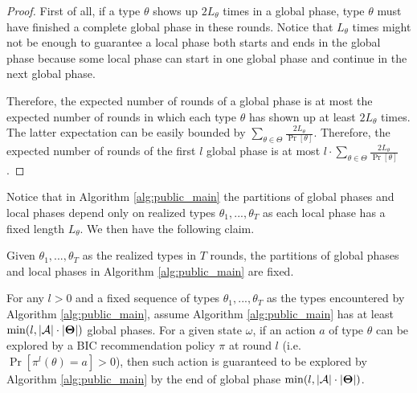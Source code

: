 \begin{proof}
First of all, if a type $\theta$ shows up $2L_{\theta}$ times in a global phase, type $\theta$ must have finished a complete global phase in these rounds. Notice that $L_{\theta}$ times might not be enough to guarantee a local phase both starts and ends in the global phase because some local phase can start in one global phase and continue in the next global phase. 

Therefore, the expected number of rounds of a global phase is at most the expected number of rounds in which each type $\theta$ has shown up at least $2L_{\theta}$ times. The latter expectation can be easily bounded by $\sum_{\theta\in\varTheta} \frac{2L_{\theta}}{\Pr[\theta]}$. Therefore, the expected number of rounds of the first $l$ global phase is at most $l \cdot \sum_{\theta\in\varTheta} \frac{2L_{\theta}}{\Pr[\theta]}$.
\end{proof}

Notice that in Algorithm \ref{alg:public_main} the partitions of global phases and local phases depend only on realized types $\theta_1,...,\theta_T$ as each local phase has a fixed length $L_{\theta}$. We then have the following claim.
\begin{claim}
Given $\theta_1,...,\theta_T$ as the realized types in $T$ rounds, the partitions of global phases and local phases in Algorithm \ref{alg:public_main} are fixed.
\end{claim}

\begin{lemma}
\label{lem:exp_public}
For any $l>0$ and a fixed sequence of types $\theta_1,...,\theta_T$ as the types encountered by Algorithm \ref{alg:public_main}, assume Algorithm \ref{alg:public_main} has at least $\min(l, |\mathcal{A}|\cdot |\bold{\Theta}|)$ global phases.
For a given state $\omega$, if an action $a$ of type $\theta$ can be explored by a BIC recommendation policy $\pi$ at round $l$ (i.e. $ \Pr[\pi^l(\theta)= a]> 0$), then such action is guaranteed to be explored by Algorithm \ref{alg:public_main} by the end of global phase $\min(l, |\mathcal{A}|\cdot |\bold{\Theta}|)$.
\end{lemma}

